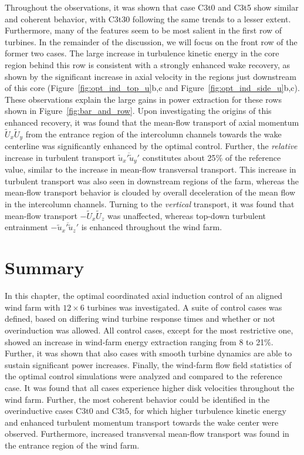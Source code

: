 	 Throughout the observations, it was shown that case C3t0 and C3t5 show similar and coherent behavior, with C3t30 following the same trends to a lesser extent. Furthermore, many of the features seem to be most salient in the first row of turbines. In the remainder of the discussion, we will focus on the front row of the former two cases. The large increase in turbulence kinetic energy in the core region behind this row is consistent with a strongly enhanced wake recovery, as shown by the significant increase in axial velocity in the regions just downstream of this core (Figure~\ref{fig:opt_ind_top_u}b,c and Figure~\ref{fig:opt_ind_side_u}b,c). These observations explain the large gains in power extraction for these rows shown in Figure~\ref{fig:bar_and_row}. Upon investigating the origins of this enhanced recovery, it was found that the mean-flow transport of axial momentum $\widetilde{U}_x \widetilde{U}_y$ from the entrance region of the intercolumn channels towards the wake centerline was significantly enhanced by the optimal control. Further, the \emph{relative} increase in turbulent transport $\overline{\widetilde{u}_x' \widetilde{u}_y'}$ constitutes about 25$\%$ of the reference value, similar to the increase in mean-flow transversal transport. This increase in turbulent transport was also seen in downstream regions of the farm, whereas the mean-flow transport behavior is clouded by overall deceleration of the mean flow in the intercolumn channels. Turning to the \emph{vertical} transport, it was found that mean-flow transport $-\widetilde{U}_x \widetilde{U}_z$ was unaffected, whereas top-down turbulent entrainment $- \overline{\widetilde{u}_x' \widetilde{u}_z'}$ is enhanced throughout the wind farm. 

\section{Summary}\label{sec:opt_ind_summ}
In this chapter, the optimal coordinated axial induction control of an aligned wind farm with $12 \times 6$ turbines was investigated. A suite of control cases was defined, based on differing wind turbine response times and whether or not overinduction was allowed. All control cases, except for the most restrictive one, showed an increase in wind-farm energy extraction ranging from 8 to 21$\%$. Further, it was shown that also cases with smooth turbine dynamics are able to sustain significant power increases. Finally, the wind-farm flow field statistics of the optimal control simulations were analyzed and compared to the reference case. It was found that all cases experience higher disk velocities throughout the wind farm. Further, the most coherent behavior could be identified in the overinductive cases C3t0 and C3t5, for which higher turbulence kinetic energy and enhanced turbulent momentum transport towards the wake center were observed. Furthermore, increased transversal mean-flow transport was found in the entrance region of the wind farm. 

